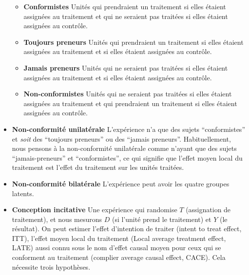 \documentclass[
  12pt,
]{book}
\providecommand{\tightlist}{%
  \setlength{\itemsep}{0pt}\setlength{\parskip}{0pt}}
\begin{document}
\begin{itemize}
  \begin{itemize}
  \tightlist
  \item
    \textbf{Conformistes} Unités qui prendraient un traitement si elles étaient assignées au traitement et qui ne seraient pas traitées si elles étaient assignées au contrôle.
  \item
    \textbf{Toujours preneurs} Unités qui prendraient un traitement si elles étaient assignées au traitement et si elles étaient assignées au contrôle.
  \item
    \textbf{Jamais preneurs} Unités qui ne seraient pas traitées si elles étaient assignées au traitement et si elles étaient assignées au contrôle.
  \item
    \textbf{Non-conformistes} Unités qui ne seraient pas traitées si elles étaient assignées au traitement et qui prendraient un traitement si elles étaient assignées au contrôle.
  \end{itemize}
\item
  \textbf{Non-conformité unilatérale} L'expérience n'a que des sujets ``conformistes'' et \emph{soit} des ``toujours preneurs'' ou des ``jamais preneurs''.
  Habituellement, nous pensons à la non-conformité unilatérale comme n'ayant que des sujets ``jamais-preneurs'' et ``conformistes'', ce qui signifie que l'effet moyen local du traitement est l'effet du traitement sur les unités traitées.
\item
  \textbf{Non-conformité bilatérale} L'expérience peut avoir les quatre groupes latents.
\item
  \textbf{Conception incitative} Une expérience qui randomise \(T\) (assignation de traitement), et nous mesurons \(D\) (si l'unité prend le traitement) et \(Y\) (le résultat).
  On peut estimer l'effet d'intention de traiter (intent to treat effect, ITT), l'effet moyen local du traitement (Local average treatment effect, LATE) aussi connu sous le nom d'effet causal moyen pour ceux qui se conforment au traitement (complier average causal effect, CACE). Cela nécessite trois hypothèses.


\end{itemize}
\end{document}
